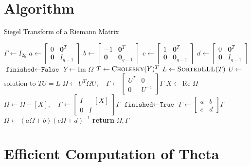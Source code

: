 \documentclass[12]{article}
\begin{document}
\section{Algorithm}

\begin{algorithm}
\caption{Siegel Transform of a Riemann Matrix}
\label{alg: siegel}
\begin{algorithmic}

  \State $\Gamma \gets I_{2g}$
  \State $a \gets \left[ \begin{smallmatrix} 0 & \mathbf{0}^T \\
      \mathbf{0} & I_{g-1} \end{smallmatrix} \right]$
  \State $b \gets \left[ \begin{smallmatrix} -1 & \mathbf{0}^T \\
      \mathbf{0} & \mathbf{0}_{g-1} \end{smallmatrix} \right]$
  \State $c \gets \left[ \begin{smallmatrix} 1 & \mathbf{0}^T \\
      \mathbf{0} & \mathbf{0}_{g-1} \end{smallmatrix} \right]$
  \State $d \gets \left[ \begin{smallmatrix} 0 & \mathbf{0}^T \\
      \mathbf{0} & I_{g-1} \end{smallmatrix} \right]$
  \State $\texttt{finished} \gets \texttt{False}$
    \State $Y \gets \text{Im } \Omega$
    \State $T \gets \textsc{Cholesky}(Y)^T$
    \State $L \gets \textsc{SortedLLL}(T)$
    \State $U \gets$ solution to $TU = L$
    \State $\Omega \gets U^T \Omega U, \quad \Gamma \gets \left[
      \begin{smallmatrix} U^T & 0 \\ 0 & U^{-1} \end{smallmatrix}
      \right] \Gamma$
    \State $X \gets \text{Re } \Omega$
    \State $\Omega \gets \Omega - [X], \quad \Gamma \gets \left[
      \begin{smallmatrix} I & -[X] \\ 0 & I \end{smallmatrix}
      \right] \Gamma$
      \State $\texttt{finished} \gets \texttt{True}$
    \Else
      \State $\Gamma \gets \left[
        \begin{smallmatrix} a & b \\ c & d \end{smallmatrix}
        \right] \Gamma$
      \State $\Omega \gets (a\Omega + b)(c \Omega + d)^{-1}$
    \EndIf
  \EndWhile
  \State \textbf{return} $\Omega, \Gamma$
\EndProcedure
\end{algorithmic}
\end{algorithm}


\section{Efficient Computation of Theta}
\end{document}
